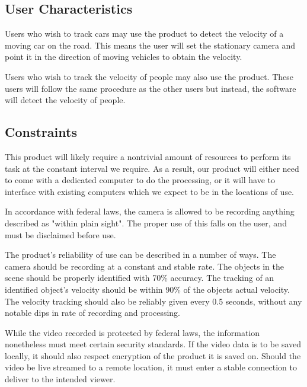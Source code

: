 \documentclass[letterpaper,10pt,onecolumn,draftclsnofoot]{IEEEtran}
\begin{document}
\subsection{User Characteristics}

Users who wish to track cars may use the product to detect the velocity of a moving car on the road.
This means the user will set the stationary camera and point it in the direction of moving vehicles to obtain the velocity.

Users who wish to track the velocity of people may also use the product.
These users will follow the same procedure as the other users but instead, the software will detect the velocity of people.

\subsection{Constraints}
This product will likely require a nontrivial amount of resources to perform its task at the constant interval we require.
As a result, our product will either need to come with a dedicated computer to do the processing, or it will have to interface with existing computers which we expect to be in the locations of use.

In accordance with federal laws, the camera is allowed to be recording anything described as "within plain sight".
The proper use of this falls on the user, and must be disclaimed before use.

The product's reliability of use can be described in a number of ways.
The camera should be recording at a constant and stable rate.
The objects in the scene should be properly identified with 70\% accuracy.
The tracking of an identified object's velocity should be within 90\% of the objects actual velocity.
The velocity tracking should also be reliably given every 0.5 seconds, without any notable dips in rate of recording and processing.

While the video recorded is protected by federal laws, the information nonetheless must meet certain security standards.
If the video data is to be saved locally, it should also respect encryption of the product it is saved on.
Should the video be live streamed to a remote location, it must enter a stable connection to deliver to the intended viewer.
\end{document}
